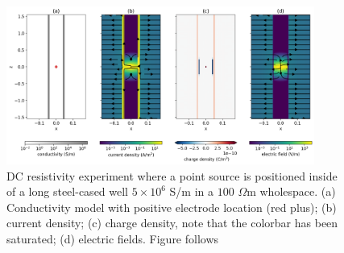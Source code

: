 \begin{figure}[!htb]
    \begin{center}
    \includegraphics[width=0.9\textwidth]{figures/kaufman-dc.png}
    \end{center}
\caption{
    DC resistivity experiment where a point source is positioned inside of a long steel-cased well $5\times10^6$ S/m in a $100$ $\Omega$m wholespace. (a) Conductivity model with positive electrode location (red plus); (b) current density; (c) charge density, note that the colorbar has been saturated; (d) electric fields. Figure follows \cite{Heagy2019a}
}
\label{fig:kaufman-dc}
\end{figure}
